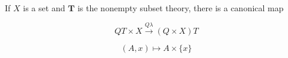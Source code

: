If $X$ is a set and $\mathbf{T}$ is the nonempty subset theory, there is a canonical map

$$QT \times X \xrightarrow{Q\lambda} (Q \times X)T$$

$$(A, x) \mapsto A \times \{x\}$$

